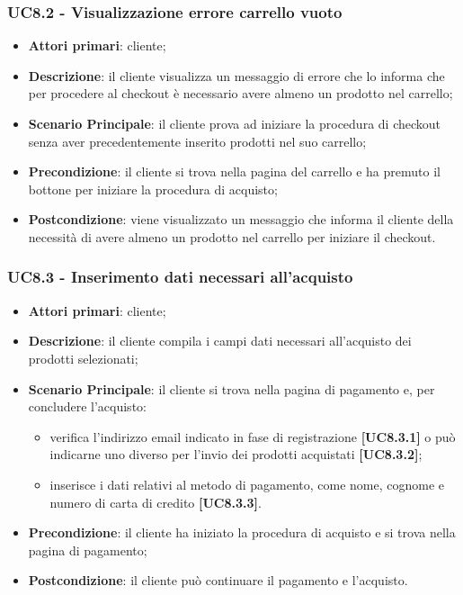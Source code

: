 \subsubsection{UC8.2 - Visualizzazione errore carrello vuoto}
\begin{itemize}
\item \textbf{Attori primari}: cliente;
\item \textbf{Descrizione}: il cliente visualizza un messaggio di errore che lo informa che per procedere al checkout è necessario avere almeno un prodotto nel carrello;
\item \textbf{Scenario Principale}: il cliente prova ad iniziare la procedura di checkout senza aver precedentemente inserito prodotti nel suo carrello;
\item \textbf{Precondizione}: il cliente si trova nella pagina del carrello e ha premuto il bottone  per iniziare la procedura di acquisto;
\item \textbf{Postcondizione}: viene visualizzato un messaggio che informa il cliente della necessità di avere almeno un prodotto nel carrello per iniziare il checkout.
\end{itemize}

\subsubsection{UC8.3 - Inserimento dati necessari all'acquisto}
\begin{itemize}
\item \textbf{Attori primari}: cliente;
\item \textbf{Descrizione}: il cliente compila i campi dati necessari all'acquisto dei prodotti selezionati;
\item \textbf{Scenario Principale}: il cliente si trova nella pagina di pagamento e, per concludere l'acquisto:
\begin{itemize}
	\item verifica l'indirizzo email indicato in fase di registrazione \textbf{[UC8.3.1]} o può indicarne uno diverso per l'invio dei prodotti acquistati \textbf{[UC8.3.2]};
	\item inserisce i dati relativi al metodo di pagamento, come nome, cognome e numero di carta di credito \textbf{[UC8.3.3]}.
\end{itemize}
\item \textbf{Precondizione}: il cliente ha iniziato la procedura di acquisto e si trova nella pagina di pagamento;
\item \textbf{Postcondizione}: il cliente può continuare il pagamento e l'acquisto.
\end{itemize}

